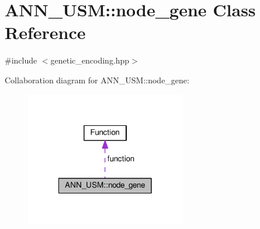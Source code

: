 \hypertarget{class_a_n_n___u_s_m_1_1node__gene}{\section{A\-N\-N\-\_\-\-U\-S\-M\-:\-:node\-\_\-gene Class Reference}
\label{class_a_n_n___u_s_m_1_1node__gene}
}


{\ttfamily \#include $<$genetic\-\_\-encoding.\-hpp$>$}



Collaboration diagram for A\-N\-N\-\_\-\-U\-S\-M\-:\-:node\-\_\-gene\-:\nopagebreak
\begin{figure}[H]
\begin{center}
\leavevmode
\includegraphics[width=198pt]{class_a_n_n___u_s_m_1_1node__gene__coll__graph}
\end{center}
\end{figure}
